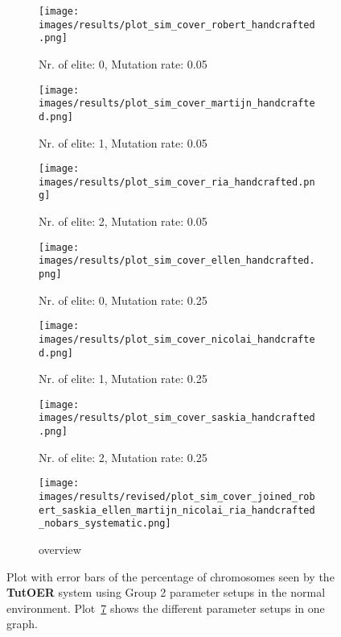 \begin{figure}[ht]
	\begin{subfigure}{0.48\linewidth}
	\texttt{[image: images/results/plot\_sim\_cover\_robert\_handcrafted.png]}
	\caption{Nr. of elite: 0, Mutation rate: 0.05}
	\label{fig:cover_handcrafted_robert}
	\end{subfigure}
	\hfill
	\begin{subfigure}{0.48\linewidth}
	\texttt{[image: images/results/plot\_sim\_cover\_martijn\_handcrafted.png]}
	\caption{Nr. of elite: 1, Mutation rate: 0.05}
	\label{fig:cover_handcrafted_martijn}
	\end{subfigure}
	\begin{subfigure}{0.48\linewidth}
	\texttt{[image: images/results/plot\_sim\_cover\_ria\_handcrafted.png]}
	\caption{Nr. of elite: 2, Mutation rate: 0.05}
	\label{fig:cover_handcrafted_ria}
	\end{subfigure}
	\hfill
	\begin{subfigure}{0.48\linewidth}
	\texttt{[image: images/results/plot\_sim\_cover\_ellen\_handcrafted.png]}
	\caption{Nr. of elite: 0, Mutation rate: 0.25}
	\label{fig:cover_handcrafted_ellen}
	\end{subfigure}
	\begin{subfigure}{0.48\linewidth}
	\texttt{[image: images/results/plot\_sim\_cover\_nicolai\_handcrafted.png]}
	\caption{Nr. of elite: 1, Mutation rate: 0.25}
	\label{fig:cover_handcrafted_nicolai}
	\end{subfigure}
	\hfill
	\begin{subfigure}{0.48\linewidth}
	\texttt{[image: images/results/plot\_sim\_cover\_saskia\_handcrafted.png]}
	\caption{Nr. of elite: 2, Mutation rate: 0.25}
	\label{fig:cover_handcrafted_saskia}
	\end{subfigure}
	\begin{subfigure}{\linewidth}
	\texttt{[image: images/results/revised/plot\_sim\_cover\_joined\_robert\_saskia\_ellen\_martijn\_nicolai\_ria\_handcrafted\_nobars\_systematic.png]}
	\caption{overview}
	\label{fig:cover_handcrafted_overview_group2}
	\end{subfigure}
	\caption[Percentage chromosomes seen in normal simulated environment for
	group 1]{Plot with error bars of the percentage of chromosomes seen by the \textbf{TutOER}
	system using Group 2 parameter setups in the normal environment.
	Plot~\ref{fig:cover_handcrafted_overview_group2} shows the
	different parameter setups in one graph.}
	\label{fig:cover_handcrafted_container_group2}
\end{figure}

